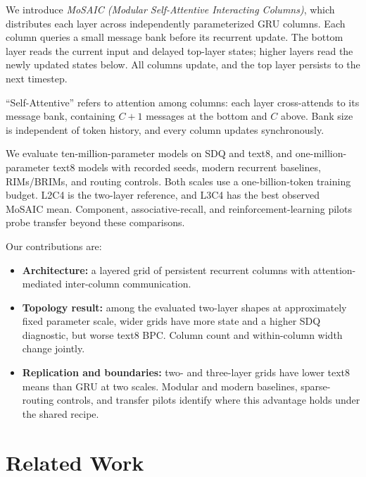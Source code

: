 \documentclass[letterpaper,twoside]{article}
\begin{document}
We introduce \emph{MoSAIC (Modular Self-Attentive Interacting Columns)}, which distributes each layer across independently parameterized GRU columns. Each column queries a small message bank before its recurrent update. The bottom layer reads the current input and delayed top-layer states; higher layers read the newly updated states below. All columns update, and the top layer persists to the next timestep.

``Self-Attentive'' refers to attention among columns: each layer cross-attends to its message bank, containing $C+1$ messages at the bottom and $C$ above. Bank size is independent of token history, and every column updates synchronously.

We evaluate ten-million-parameter models on SDQ and text8, and one-million-parameter text8 models with recorded seeds, modern recurrent baselines, RIMs/BRIMs, and routing controls. Both scales use a one-billion-token training budget. L2C4 is the two-layer reference, and L3C4 has the best observed MoSAIC mean. Component, associative-recall, and reinforcement-learning pilots probe transfer beyond these comparisons.

Our contributions are:
\begin{itemize}
    \item \textbf{Architecture:} a layered grid of persistent recurrent columns with attention-mediated inter-column communication.
    \item \textbf{Topology result:} among the evaluated two-layer shapes at approximately fixed parameter scale, wider grids have more state and a higher SDQ diagnostic, but worse text8 BPC. Column count and within-column width change jointly.
    \item \textbf{Replication and boundaries:} two- and three-layer grids have lower text8 means than GRU at two scales. Modular and modern baselines, sparse-routing controls, and transfer pilots identify where this advantage holds under the shared recipe.
\end{itemize}

\section{Related Work}
\end{document}
